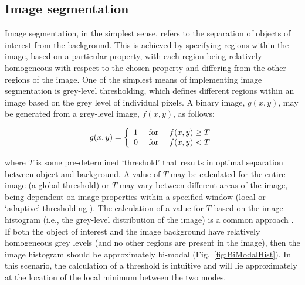 \subsection{Image segmentation}

Image segmentation, in the simplest sense, refers to the separation of objects of interest from the background. This is achieved by specifying regions within the image, based on a particular property, with each region being relatively homogeneous with respect to the chosen property and differing from the other regions of the image. One of the simplest means of implementing image segmentation is grey-level thresholding, which defines different regions within an image based on the grey level of individual pixels. A binary image, $g(x,y)$, may be generated from a grey-level image, $f(x,y)$, as follows:

\begin{equation}
	g(x,y) = \left\{ \begin{array}{l l l}	1 & \mbox{ for } & f(x,y) \geq T \\
																						0 & \mbox{ for } & f(x,y) < T \end{array} \right.
\end{equation}

\noindent where $T$ is some pre-determined \lq threshold' that results in optimal separation between object and background. A value of $T$ may be calculated for the entire image (a global threshold) or $T$ may vary between different areas of the image, being dependent on image properties within a specified window (local or \lq adaptive' thresholding \cite{wilkinson1998}). The calculation of a value for $T$ based on the image histogram (i.e., the grey-level distribution of the image) is a common approach \cite{wilkinson1998}. If both the object of interest and the image background have relatively homogeneous grey levels (and no other regions are present in the image), then the image histogram should be approximately bi-modal (Fig.~\ref{fig:BiModalHist}). In this scenario, the calculation of a threshold is intuitive and will lie approximately at the location of the local minimum between the two modes.

